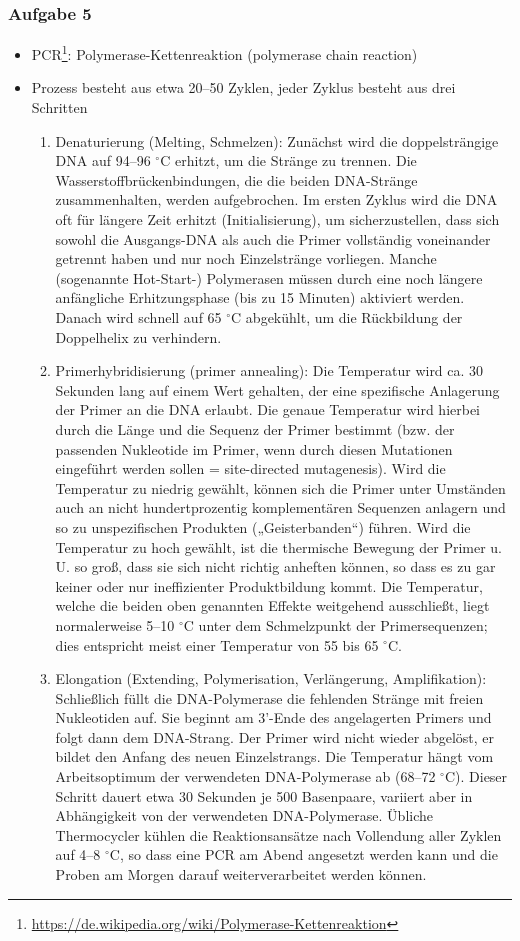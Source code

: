 \subsubsection{Aufgabe 5}
\begin{itemize}
	\item PCR\footnote{\url{https://de.wikipedia.org/wiki/Polymerase-Kettenreaktion}}: Polymerase-Kettenreaktion (polymerase chain reaction)
	\item Prozess besteht aus etwa 20–50 Zyklen, jeder Zyklus besteht aus drei Schritten
	\begin{enumerate}
		\item Denaturierung (Melting, Schmelzen): Zunächst wird die doppelsträngige DNA auf 94–96 $^\circ$C erhitzt, um die Stränge zu trennen. Die Wasserstoffbrückenbindungen, die die beiden DNA-Stränge zusammenhalten, werden aufgebrochen. Im ersten Zyklus wird die DNA oft für längere Zeit erhitzt (Initialisierung), um sicherzustellen, dass sich sowohl die Ausgangs-DNA als auch die Primer vollständig voneinander getrennt haben und nur noch Einzelstränge vorliegen. Manche (sogenannte Hot-Start-) Polymerasen müssen durch eine noch längere anfängliche Erhitzungsphase (bis zu 15 Minuten) aktiviert werden. Danach wird schnell auf 65 $^\circ$C abgekühlt, um die Rückbildung der Doppelhelix zu verhindern.
		\item Primerhybridisierung (primer annealing): Die Temperatur wird ca. 30 Sekunden lang auf einem Wert gehalten, der eine spezifische Anlagerung der Primer an die DNA erlaubt. Die genaue Temperatur wird hierbei durch die Länge und die Sequenz der Primer bestimmt (bzw. der passenden Nukleotide im Primer, wenn durch diesen Mutationen eingeführt werden sollen = site-directed mutagenesis). Wird die Temperatur zu niedrig gewählt, können sich die Primer unter Umständen auch an nicht hundertprozentig komplementären Sequenzen anlagern und so zu unspezifischen Produkten („Geisterbanden“) führen. Wird die Temperatur zu hoch gewählt, ist die thermische Bewegung der Primer u. U. so groß, dass sie sich nicht richtig anheften können, so dass es zu gar keiner oder nur ineffizienter Produktbildung kommt. Die Temperatur, welche die beiden oben genannten Effekte weitgehend ausschließt, liegt normalerweise 5–10 $^\circ$C unter dem Schmelzpunkt der Primersequenzen; dies entspricht meist einer Temperatur von 55 bis 65 $^\circ$C.
		\item Elongation (Extending, Polymerisation, Verlängerung, Amplifikation): Schließlich füllt die DNA-Polymerase die fehlenden Stränge mit freien Nukleotiden auf. Sie beginnt am 3'-Ende des angelagerten Primers und folgt dann dem DNA-Strang. Der Primer wird nicht wieder abgelöst, er bildet den Anfang des neuen Einzelstrangs. Die Temperatur hängt vom Arbeitsoptimum der verwendeten DNA-Polymerase ab (68–72 $^\circ$C). Dieser Schritt dauert etwa 30 Sekunden je 500 Basenpaare, variiert aber in Abhängigkeit von der verwendeten DNA-Polymerase. Übliche Thermocycler kühlen die Reaktionsansätze nach Vollendung aller Zyklen auf 4–8 $^\circ$C, so dass eine PCR am Abend angesetzt werden kann und die Proben am Morgen darauf weiterverarbeitet werden können.
	\end{enumerate}
\end{itemize}

